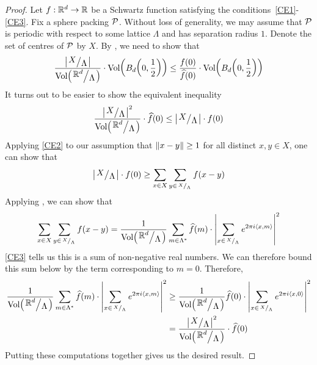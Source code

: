 \begin{proof}
    Let $f : \mathbb{R}^d \to \mathbb{R}$ be a Schwartz function satisfying the conditions~\ref{CE1}-\ref{CE3}. Fix a sphere packing $\mathcal{P}$. Without loss of generality, we may assume that $\mathcal{P}$ is periodic with respect to some lattice $\Lambda$ and has separation radius $1$. Denote the set of centres of $\mathcal{P}$ by $X$. By , we need to show that
    \begin{align}
        \frac{\abs{\quotient{X}{\Lambda}}}{\Volof{\quotient{\R^d}{\Lambda}}} \cdot \Volof{B_d\of{0, \frac{1}{2}}} \leq \frac{f(0)}{\hat{f}(0)} \cdot \Volof{B_d\of{0, \frac{1}{2}}}
        \label{Ch2:Eq:CohnElkies_Ineq_1}
    \end{align}
    It turns out to be easier to show the equivalent inequality
    \begin{align}
        \frac{\abs{\quotient{X}{\Lambda}}^2}{\Volof{\quotient{\R^d}{\Lambda}}} \cdot \hat{f}(0) \leq \abs{\quotient{X}{\Lambda}} \cdot f(0)
        \label{Ch2:Eq:CohnElkies_Ineq_2}
    \end{align}
    Applying \ref{CE2} to our assumption that $\left\lVert x - y \right\rVert \geq 1$ for all distinct $x, y \in X$, one can show that
    \begin{align}
        \abs{\quotient{X}{\Lambda}} \cdot f(0) \geq \sum_{x \in X} \sum_{y \in {\tiny \quotient{X}{\Lambda}}} \fof{x - y}
        \label{Ch2:Eq:CohnElkies_Ineq_3}
    \end{align}
    Applying , we can show that
    \begin{align*}
        \sum_{x \in X} \sum_{y \in {\tiny \quotient{X}{\Lambda}}} \fof{x - y}
        =
        \frac{1}{\Volof{\quotient{\R^d}{\Lambda}}}\sum_{m \in \Lambda^*} \hat{f}(m) \cdot \abs{\sum_{x \in {\tiny \quotient{X}{\Lambda}}} e^{2 \pi i \cycl{x, m}}}^2
    \end{align*}
    \ref{CE3} tells us this is a sum of non-negative real numbers. We can therefore bound this sum below by the term corresponding to $m = 0$. Therefore,
    \begin{align}
        \frac{1}{\Volof{\quotient{\R^d}{\Lambda}}}\sum_{m \in \Lambda^*} \hat{f}(m) \cdot \abs{\sum_{x \in {\tiny \quotient{X}{\Lambda}}} e^{2 \pi i \cycl{x, m}}}^2
        &\geq
        \frac{1}{\Volof{\quotient{\R^d}{\Lambda}}} \hat{f}(0) \cdot \abs{\sum_{x \in {\tiny \quotient{X}{\Lambda}}} e^{2 \pi i \cycl{x, 0}}}^2 \label{Ch2:Eq:CohnElkies_Ineq_4} \\
        &= \frac{\abs{\quotient{X}{\Lambda}}^2}{\Volof{\quotient{\R^d}{\Lambda}}} \cdot \hat{f}(0) \nonumber
    \end{align}
    Putting these computations together gives us the desired result.
\end{proof}

